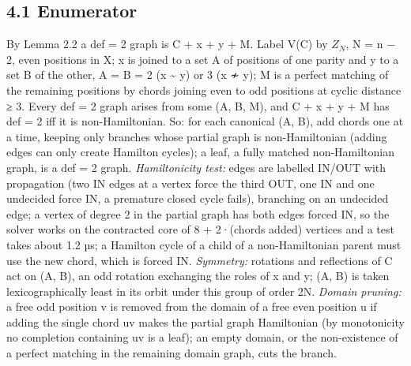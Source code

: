 \documentclass[11pt,a4paper]{article}
\theoremstyle{named}
\begin{document}
\subsection*{4.1 Enumerator}
By Lemma 2.2 a def = 2 graph is C + x + y + M. Label V(C) by $Z_N$, N = n − 2, even positions in X; x is joined to a set A of positions of one parity and y to a set B of the other, \textbar{}A\textbar{} = \textbar{}B\textbar{} = 2 (x \textasciitilde{} y) or 3 (x ≁ y); M is a perfect matching of the remaining positions by chords joining even to odd positions at cyclic distance ≥ 3. Every def = 2 graph arises from some (A, B, M), and C + x + y + M has def = 2 iff it is non-Hamiltonian. So: for each canonical (A, B), add chords one at a time, keeping only branches whose partial graph is non-Hamiltonian (adding edges can only create Hamilton cycles); a leaf, a fully matched non-Hamiltonian graph, is a def = 2 graph. \textit{Hamiltonicity test:} edges are labelled IN/OUT with propagation (two IN edges at a vertex force the third OUT, one IN and one undecided force IN, a premature closed cycle fails), branching on an undecided edge; a vertex of degree 2 in the partial graph has both edges forced IN, so the solver works on the contracted core of 8 + 2·(chords added) vertices and a test takes about 1.2 µs; a Hamilton cycle of a child of a non-Hamiltonian parent must use the new chord, which is forced IN. \textit{Symmetry:} rotations and reflections of C act on (A, B), an odd rotation exchanging the roles of x and y; (A, B) is taken lexicographically least in its orbit under this group of order 2N. \textit{Domain pruning:} a free odd position v is removed from the domain of a free even position u if adding the single chord uv makes the partial graph Hamiltonian (by monotonicity no completion containing uv is a leaf); an empty domain, or the non-existence of a perfect matching in the remaining domain graph, cuts the branch.
\end{document}

